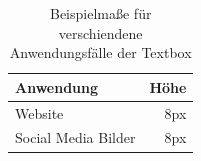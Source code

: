 \documentclass{article}
\begin{document}
\begin{table}[hb]
\begin{center}
\begin{tabular}{ | l | r | }
\hline
  Anwendung & Höhe \\
\hline
  Website & 8px \\
\hline
  Social Media Bilder & 8px \\
\hline
\end{tabular}
\end{center}
\caption{Beispielmaße für verschiendene Anwendungsfälle der Textbox}
\end{table}

\end{document}
